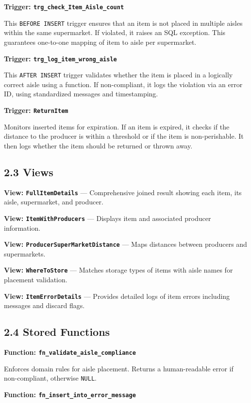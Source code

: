 \documentclass[a4paper,12pt]{article}
\begin{document}
\textbf{Trigger: \texttt{trg\_check\_Item\_Aisle\_count}}

This \texttt{BEFORE INSERT} trigger ensures that an item is not placed in multiple aisles within the same supermarket. If violated, it raises an SQL exception. This guarantees one-to-one mapping of item to aisle per supermarket.

\textbf{Trigger: \texttt{trg\_log\_item\_wrong\_aisle}}

This \texttt{AFTER INSERT} trigger validates whether the item is placed in a logically correct aisle using a function. If non-compliant, it logs the violation via an error ID, using standardized messages and timestamping.

\textbf{Trigger: \texttt{ReturnItem}}

Monitors inserted items for expiration. If an item is expired, it checks if the distance to the producer is within a threshold or if the item is non-perishable. It then logs whether the item should be returned or thrown away.

\subsection*{2.3 Views}

\textbf{View: \texttt{FullItemDetails}} — Comprehensive joined result showing each item, its aisle, supermarket, and producer.

\textbf{View: \texttt{ItemWithProducers}} — Displays item and associated producer information.

\textbf{View: \texttt{ProducerSuperMarketDistance}} — Maps distances between producers and supermarkets.

\textbf{View: \texttt{WhereToStore}} — Matches storage types of items with aisle names for placement validation.

\textbf{View: \texttt{ItemErrorDetails}} — Provides detailed logs of item errors including messages and discard flags.

\subsection*{2.4 Stored Functions}

\textbf{Function: \texttt{fn\_validate\_aisle\_compliance}}

Enforces domain rules for aisle placement. Returns a human-readable error if non-compliant, otherwise \texttt{NULL}.

\textbf{Function: \texttt{fn\_insert\_into\_error\_message}}
\end{document}
